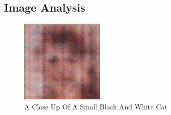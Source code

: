 \documentclass{article}%
\begin{document}
%
\subsection{Image Analysis}%
\label{subsec:ImageAnalysis}%


\begin{figure}[h!]%
\centering%
\includegraphics[width=150px]{500_fake_images/samples_5_265.png}%
\caption{A Close Up Of A Small Black And White Cat}%
\end{figure}

%
\end{document}
